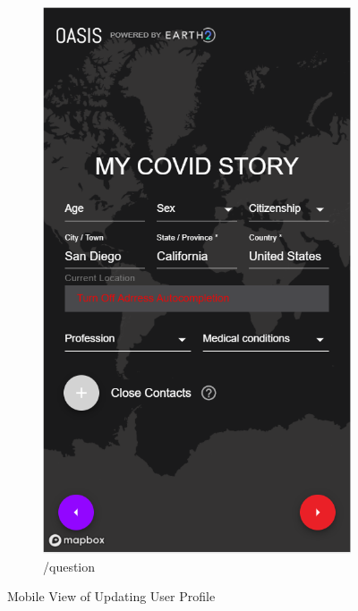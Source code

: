 \documentclass{ucsdreport}
\begin{document}
\begin{figure}[H]
\begin{subfigure}{.33\textwidth}
		\includegraphics[scale = 0.47]{images/update3.PNG}
		\caption{/question}
	\end{subfigure}
	\caption{ Mobile View of Updating User Profile}
\end{figure}
\end{document}
